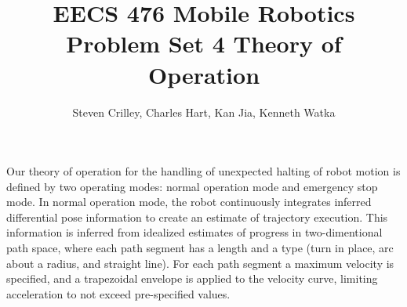 \documentclass[english]{article}
\begin{document}
\title{EECS 476 Mobile Robotics Problem Set 4 Theory of Operation}

\author{Steven Crilley, Charles Hart, Kan Jia, Kenneth Watka}

\maketitle
Our theory of operation for the handling of unexpected halting of
robot motion is defined by two operating modes: normal operation mode
and emergency stop mode. In normal operation mode, the robot continuously
integrates inferred differential pose information to create an estimate
of trajectory execution. This information is inferred from idealized
estimates of progress in two-dimentional path space, where each path
segment has a length and a type (turn in place, arc about a radius,
and straight line). For each path segment a maximum velocity is specified,
and a trapezoidal envelope is applied to the velocity curve, limiting
acceleration to not exceed pre-specified values. 
\end{document}
